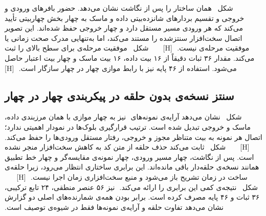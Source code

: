 ‫
‫
‫
‫
‫شکل~ همان ساختار را پس از نگاشت نشان می‌دهد. حضور
‫بافرهای ورودی و خروجی و تقسیم بردارهای شانزده‌بیتی داده و ماسک به چهار بخش چهار‌بیتی
‫تأیید می‌کند که هر ورودی مسیر مستقل دارد و چهار خروجی  حفظ شده‌اند.
‫این تصویر اتصال سخت‌افزار سنتزشده را مستند می‌کند، اما به‌تنهایی مدرک صحت زمانی یا موفقیت
‫مرحله‌ی  نیست.
‫
‫[H]
‫
‫
‫
‫
‫
‫شکل~ موفقیت مرحله‌ی  برای
‫سطح بالای  را ثبت می‌کند. مقدار ۳۶ ثبات دقیقاً از ۱۶ بیت داده، ۱۶ بیت ماسک
‫و چهار بیت اعتبار حاصل می‌شود. استفاده از ۴۶ پایه نیز با رابط موازی چهار در چهار سازگار است.
‫
‫[H]
‫
‫
‫
‫
‫
‫\subsection{سنتز نسخه‌ی بدون حلقه در پیکربندی چهار در چهار}
‫
‫شکل~ نشان می‌دهد آرایه‌ی نمونه‌های
‫ نیز به چهار  موازی با همان مرزبندی داده، ماسک و
‫خروجی تبدیل شده است. ترتیب قرارگیری بلوک‌ها در نمودار اهمیتی ندارد؛ اتصال هر نمونه به
‫بیت متناظر مجوز و خروجی، رفتار مستقل ورودی‌ها را حفظ می‌کند.
‫
‫[H]
‫
‫
‫
‫
‫
‫شکل~ ثابت می‌کند حذف حلقه از متن کد به کاهش
‫سخت‌افزار منجر نشده است. پس از نگاشت، چهار مسیر ورودی، چهار نمونه‌ی مقایسه‌گر و چهار خط
‫تطبیق همانند نسخه‌ی حلقه‌دار باقی مانده‌اند. این برابری ساختاری انتظار می‌رود، زیرا حلقه‌ی
‫ساخت در زمان تشریح باز می‌شود و منبع سخت‌افزاری زمان اجرا نیست.
‫
‫[H]
‫
‫
‫
‫
‫
‫شکل~ نتیجه‌ی کمی این برابری را ارائه می‌کند.
‫ نیز ۵۶ عنصر منطقی، ۲۴ تابع ترکیبی، ۳۶ ثبات و ۴۶ پایه مصرف کرده
‫است. برابر بودن همه‌ی شمارنده‌های اصلی دو گزارش نشان می‌دهد تفاوت حلقه و آرایه‌ی نمونه‌ها
‫فقط در شیوه‌ی توصیف  است.
